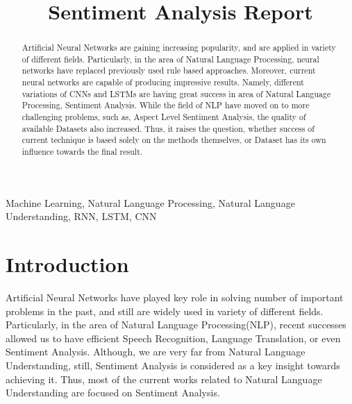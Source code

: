 \documentclass[conference]{IEEEtran}
\begin{document}
\title{Sentiment Analysis Report\\
}

\author{
	\and
}

\maketitle

\newcommand{\RT}{Rotten Tomatoes }
\newcommand{\TW}{Sentiment140 }

\begin{abstract}
Artificial Neural Networks are gaining increasing popularity, and are applied in variety of different fields. Particularly, in the area of Natural Language Processing, neural networks have replaced previously used rule based approaches. Moreover, current neural networks are capable of producing impressive results. Namely, different variations of CNNs and LSTMs are having great success in area of Natural Language Processing, Sentiment Analysis. While the field of NLP have moved on to more challenging problems, such as, Aspect Level Sentiment Analysis, the quality of available Datasets also increased. Thus, it raises the question, whether success of current technique is based solely on the methods themselves, or Dataset has its own influence towards the final result.
\end{abstract}

\begin{IEEEkeywords}
Machine Learning, Natural Language Processing, Natural Language Understanding, RNN, LSTM, CNN
\end{IEEEkeywords}

\section{Introduction}

Artificial Neural Networks have played key role in solving number of important problems in the past, and still are widely used in variety of different fields. Particularly, in the area of Natural Language Processing(NLP), recent successes allowed us to have efficient Speech Recognition, Language Translation, or even Sentiment Analysis. Although, we are very far from Natural Language Understanding, still, Sentiment Analysis is considered as a key insight towards achieving it. Thus, most of the current works related to Natural Language Understanding are focused on Sentiment Analysis.
\end{document}
